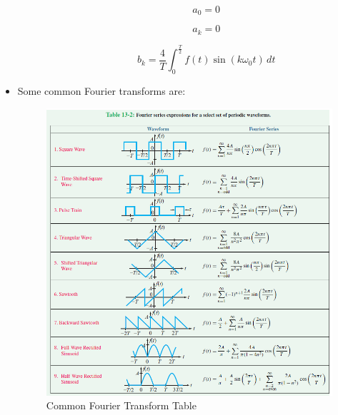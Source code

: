 \begin{itemize}
\begin{itemize}
\begin{itemize}
            $$a_0=0$$

            $$a_k=0$$

            $$b_k=\frac{4}{T}\int_0^{\frac{T}{2}}f(t)\sin(k\omega_0t)\,dt$$

        \end{itemize}

    \end{itemize}

  \item Some common Fourier transforms are:

  \begin{center}
    \begin{figure}[h!]
      \centering
      \includegraphics[width=.65\textwidth]{Figures/FT.png}
      \caption{Common Fourier Transform Table}
      \label{fig:1}
    \end{figure}
  \end{center}

\end{itemize}



